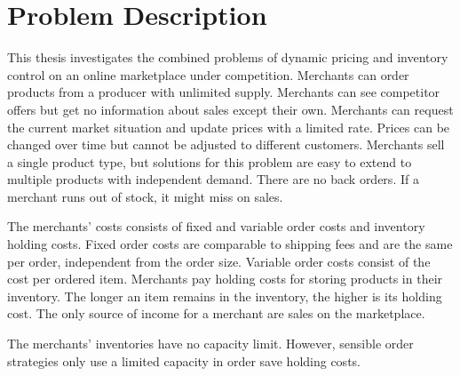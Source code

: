 
\chapter{Problem Description}
This thesis investigates the combined problems of dynamic pricing and inventory control on an online marketplace under competition.
Merchants can order products from a producer with unlimited supply. 
Merchants can see competitor offers but get no information about sales except their own.
Merchants can request the current market situation and update prices with a limited rate.
Prices can be changed over time but cannot be adjusted to different customers.
Merchants sell a single product type, but solutions for this problem are easy to extend to multiple products with independent demand.
There are no back orders. If a merchant runs out of stock, it might miss on sales.

The merchants' costs consists of fixed and variable order costs and inventory holding costs.
Fixed order costs are comparable to shipping fees and are the same per order, independent from the order size.
Variable order costs consist of the cost per ordered item.
Merchants pay holding costs for storing products in their inventory.
The longer an item remains in the inventory, the higher is its holding cost. 
The only source of income for a merchant are sales on the marketplace.

The merchants' inventories have no capacity limit.
However, sensible order strategies only use a limited capacity in order save holding costs.



